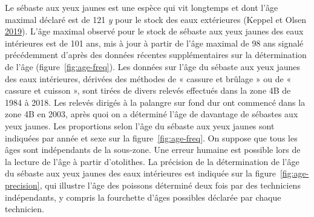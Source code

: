 \documentclass[french,11pt]{book}
\begin{document}
\hypertarget{sec:growth}{%
\label{sec:growth}}

Le sébaste aux yeux jaunes est une espèce qui vit longtemps et dont l'âge maximal déclaré est de 121 \emph{y} pour le stock des eaux extérieures (Keppel et Olsen \protect\hyperlink{ref-keppel2019}{2019}). L'âge maximal observé pour le stock de sébaste aux yeux jaunes des eaux intérieures est de 101 ans, mis à jour à partir de l'âge maximal de 98 ans signalé précédemment d'après des données récentes supplémentaires sur la détermination de l'âge (figure~\ref{fig:age-freq}). Les données sur l'âge du sébaste aux yeux jaunes des eaux intérieures, dérivées des méthodes de « cassure et brûlage » ou de « cassure et cuisson », sont tirées de divers relevés effectués dans la zone 4B de 1984 à 2018. Les relevés dirigés à la palangre sur fond dur ont commencé dans la zone 4B en 2003, après quoi on a déterminé l'âge de davantage de sébastes aux yeux jaunes. Les proportions selon l'âge du sébaste aux yeux jaunes sont indiquées par année et sexe sur la figure~\ref{fig:age-freq}. On suppose que tous les âges sont indépendants de la sous-zone. Une erreur humaine est possible lors de la lecture de l'âge à partir d'otolithes. La précision de la détermination de l'âge du sébaste aux yeux jaunes des eaux intérieures est indiquée sur la figure~\ref{fig:age-precision}, qui illustre l'âge des poissons déterminé deux fois par des techniciens indépendants, y compris la fourchette d'âges possibles déclarée par chaque technicien.
\end{document}
